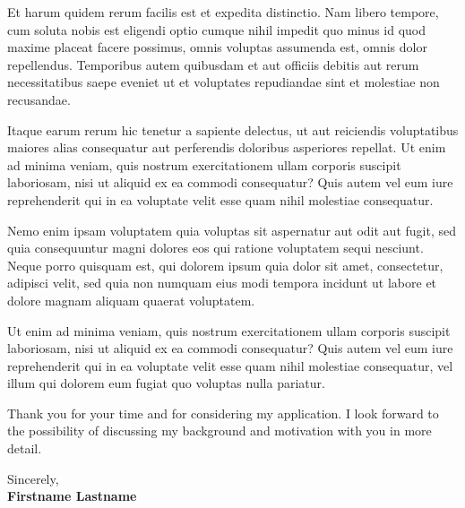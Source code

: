 \documentclass[11pt]{report}
\begin{document}
\begin{titlepage}
\noindent Et harum quidem rerum facilis est et expedita distinctio. Nam libero tempore, cum soluta nobis est eligendi optio cumque nihil impedit quo minus id quod maxime placeat facere possimus, omnis voluptas assumenda est, omnis dolor repellendus. Temporibus autem quibusdam et aut officiis debitis aut rerum necessitatibus saepe eveniet ut et voluptates repudiandae sint et molestiae non recusandae. 

\vspace{1.0em}

\noindent Itaque earum rerum hic tenetur a sapiente delectus, ut aut reiciendis voluptatibus maiores alias consequatur aut perferendis doloribus asperiores repellat. Ut enim ad minima veniam, quis nostrum exercitationem ullam corporis suscipit laboriosam, nisi ut aliquid ex ea commodi consequatur? Quis autem vel eum iure reprehenderit qui in ea voluptate velit esse quam nihil molestiae consequatur.

\vspace{1.0em}

\noindent Nemo enim ipsam voluptatem quia voluptas sit aspernatur aut odit aut fugit, sed quia consequuntur magni dolores eos qui ratione voluptatem sequi nesciunt. Neque porro quisquam est, qui dolorem ipsum quia dolor sit amet, consectetur, adipisci velit, sed quia non numquam eius modi tempora incidunt ut labore et dolore magnam aliquam quaerat voluptatem.

\vspace{1.0em}

\noindent Ut enim ad minima veniam, quis nostrum exercitationem ullam corporis suscipit laboriosam, nisi ut aliquid ex ea commodi consequatur? Quis autem vel eum iure reprehenderit qui in ea voluptate velit esse quam nihil molestiae consequatur, vel illum qui dolorem eum fugiat quo voluptas nulla pariatur.

\vspace{1.0em}

\noindent Thank you for your time and for considering my application. I look forward to the possibility of discussing my background and motivation with you in more detail.

\vspace{1.0em}

\raggedright Sincerely,\\
\textbf{Firstname Lastname}

\end{titlepage}
\end{document}

